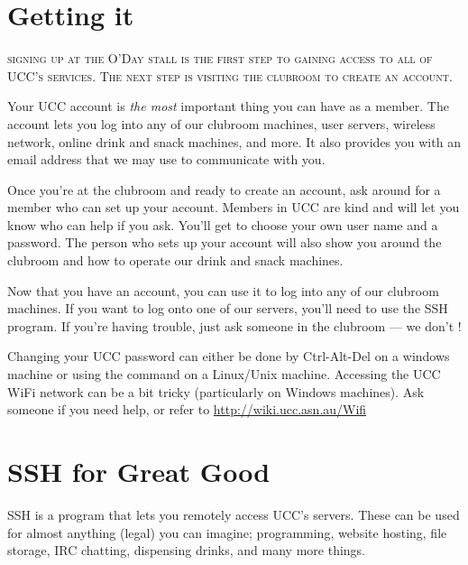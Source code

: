 \label{SetupAccount}



\section{Getting it}

\textsc{signing up at the O'Day stall is the first step to gaining access to all of UCC's services. The next step is visiting the clubroom to create an account.}

Your UCC account is \emph{the most} important thing you can have as a member.
The account lets you log into any of our clubroom machines, user servers, wireless network, online drink and snack machines, and more.
It also provides you with an email address that we may use to communicate with you.

Once you're at the clubroom and ready to create an account, ask around for a member who can set up your account. Members in UCC are kind and will let you know who can help if you ask. You'll get to choose your own user name and a password. The person who sets up your account will also show you around the clubroom and how to operate our drink and snack machines.

Now that you have an account, you can use it to log into any of our clubroom machines. If you want to log onto one of our servers, you'll need to use the SSH program. If you're having trouble, just ask someone in the clubroom --- we don't !

Changing your UCC password can either be done by Ctrl-Alt-Del on a windows machine or using the command  on a Linux/Unix machine.
Accessing the UCC WiFi network can be a bit tricky (particularly on Windows machines). Ask someone if you need help, or refer to \url{http://wiki.ucc.asn.au/Wifi}




\section{SSH for Great Good}

SSH is a program that lets you remotely access UCC's servers. These can be used for almost anything (legal) you can imagine; programming, website hosting, file storage, IRC chatting, dispensing drinks, and many more things.


